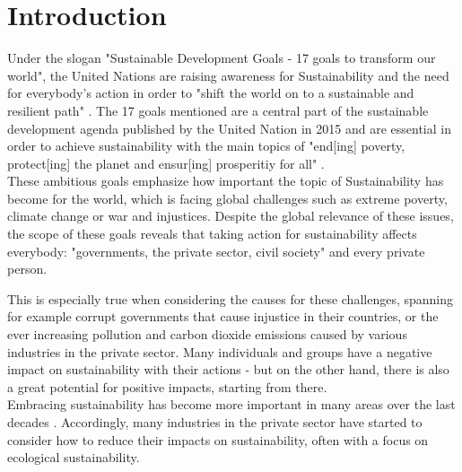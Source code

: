 \documentclass[oribibl]{llncs}
\begin{document}
\section{Introduction}
Under the slogan "Sustainable Development Goals - 17 goals to transform our world"\cite{nino_sustainable_2017}, the United Nations are raising awareness for Sustainability and the need for everybody's action in order to "shift the world on to a sustainable and resilient path" \cite{UN_transform_15}%
. The 17 goals mentioned are a central part of the sustainable development agenda published by the United Nation in 2015 \cite{UN_transform_15}%
and are essential in order to achieve sustainability with the main topics of "end[ing] poverty, protect[ing] the planet and ensur[ing] prosperitiy for all" \cite{nino_sustainable_2017}.\\
These ambitious goals emphasize how important the topic of Sustainability has become for the world, which is facing global challenges such as extreme poverty, climate change or war and injustices. Despite the global relevance of these issues, the scope of these goals reveals that taking action for sustainability affects everybody: "governments, the private sector, civil society"\cite{nino_sustainable_2017} and every private person. 

This is especially true when considering the causes for these challenges, spanning for example corrupt governments that cause injustice in their countries, or the ever increasing pollution and carbon dioxide emissions caused by various industries in the private sector. Many individuals and groups %
have a negative impact on sustainability with their actions - but on the other hand, there is also a great potential for positive impacts, starting from there.\\
Embracing sustainability has become more important in many areas over the last decades %
. Accordingly, many industries in the private sector have started to consider how to reduce their impacts on sustainability, often with a focus on ecological sustainability. %
\end{document}
